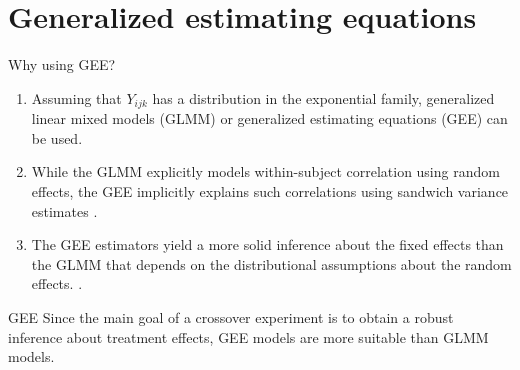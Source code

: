 \documentclass[t,9pt]{beamer}
\begin{document}
\section{Generalized estimating equations}
\begin{frame}[fragile]{Why using GEE?}
\begin{enumerate}
    \item  Assuming that  $Y_{ijk}$ has a distribution in the exponential family,  generalized linear mixed models (GLMM) or generalized estimating equations (GEE) can be used.
    \item While the GLMM explicitly models within-subject correlation using random effects, the GEE implicitly explains such correlations using sandwich variance estimates \citep{liang1986longitudinal}.
    \item The GEE estimators yield a more solid inference about the fixed effects than the GLMM that depends on the distributional assumptions about the random effects. \citep{zhang2012new}.
\end{enumerate}
\begin{block}{GEE}    
Since the main goal of a crossover experiment is to obtain a robust inference about treatment effects, GEE models are more suitable than GLMM models.
\end{block}
   \end{frame}
\end{document}
